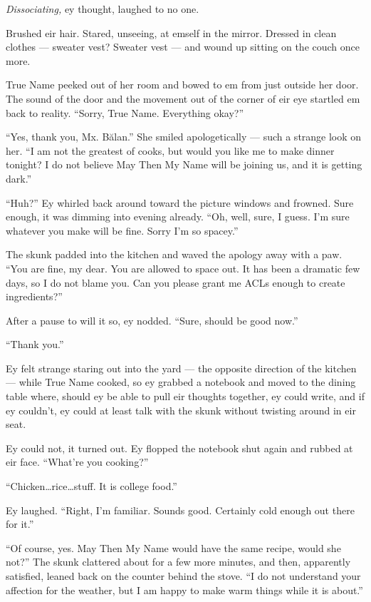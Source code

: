 \emph{Dissociating,} ey thought, laughed to no one.

Brushed eir hair. Stared, unseeing, at emself in the mirror. Dressed in clean clothes — sweater vest? Sweater vest — and wound up sitting on the couch once more.

True Name peeked out of her room and bowed to em from just outside her door. The sound of the door and the movement out of the corner of eir eye startled em back to reality. ``Sorry, True Name. Everything okay?''

``Yes, thank you, Mx. Bălan.'' She smiled apologetically — such a strange look on her. ``I am not the greatest of cooks, but would you like me to make dinner tonight? I do not believe May Then My Name will be joining us, and it is getting dark.''

``Huh?'' Ey whirled back around toward the picture windows and frowned. Sure enough, it was dimming into evening already. ``Oh, well, sure, I guess. I'm sure whatever you make will be fine. Sorry I'm so spacey.''

The skunk padded into the kitchen and waved the apology away with a paw. ``You are fine, my dear. You are allowed to space out. It has been a dramatic few days, so I do not blame you. Can you please grant me ACLs enough to create ingredients?''

After a pause to will it so, ey nodded. ``Sure, should be good now.''

``Thank you.''

Ey felt strange staring out into the yard — the opposite direction of the kitchen — while True Name cooked, so ey grabbed a notebook and moved to the dining table where, should ey be able to pull eir thoughts together, ey could write, and if ey couldn't, ey could at least talk with the skunk without twisting around in eir seat.

Ey could not, it turned out. Ey flopped the notebook shut again and rubbed at eir face. ``What're you cooking?''

``Chicken\ldots rice\ldots stuff. It is college food.''

Ey laughed. ``Right, I'm familiar. Sounds good. Certainly cold enough out there for it.''

``Of course, yes. May Then My Name would have the same recipe, would she not?'' The skunk clattered about for a few more minutes, and then, apparently satisfied, leaned back on the counter behind the stove. ``I do not understand your affection for the weather, but I am happy to make warm things while it is about.''

